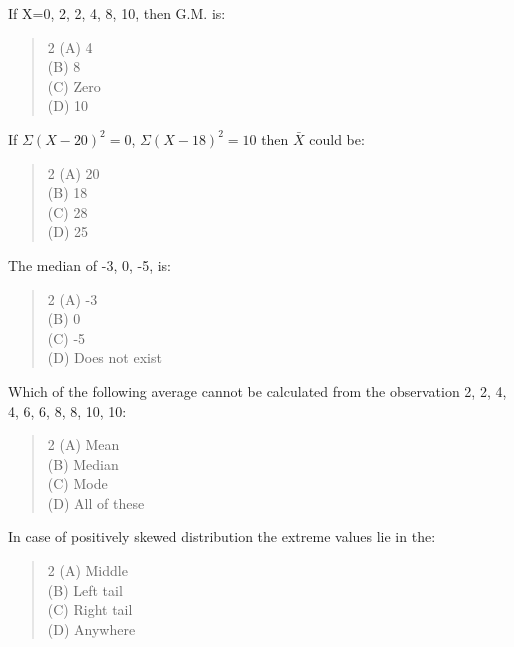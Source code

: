 \documentclass[11pt,a4paper]{article}
\begin{document}
\begin{mcqlist}
\item If X=0, 2, 2, 4, 8, 10, then G.M. is:
\begin{quote}\begin{multicols}{2}
\noindent (A) 4 \\
(B) 8 \\
(C) Zero \\
(D) 10
\end{multicols}\end{quote}

\item If $\Sigma (X-20)^2=0$, $\Sigma (X-18)^2=10$ then $\bar{X}$ could be:
\begin{quote}\begin{multicols}{2}
\noindent (A) 20 \\
(B) 18 \\
(C) 28 \\
(D) 25
\end{multicols}\end{quote}

\item The median of -3, 0, -5, is:
\begin{quote}\begin{multicols}{2}
\noindent (A) -3 \\
(B) 0 \\
(C) -5 \\
(D) Does not exist
\end{multicols}\end{quote}

\item Which of the following average cannot be calculated from the observation 2, 2, 4, 4, 6, 6, 8, 8, 10, 10:
\begin{quote}\begin{multicols}{2}
\noindent (A) Mean \\
(B) Median \\
(C) Mode \\
(D) All of these
\end{multicols}\end{quote}

\item In case of positively skewed distribution the extreme values lie in the:
\begin{quote}\begin{multicols}{2}
\noindent (A) Middle \\
(B) Left tail \\
(C) Right tail \\
(D) Anywhere
\end{multicols}\end{quote}


\end{mcqlist}
\end{document}
